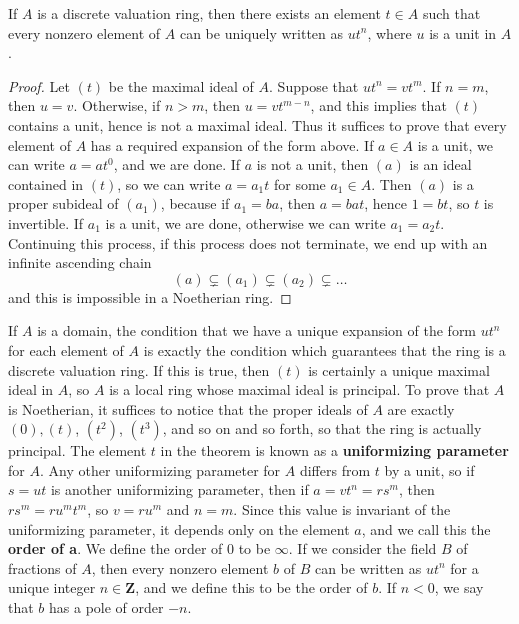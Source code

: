 \begin{prop}
    If $A$ is a discrete valuation ring, then there exists an element $t \in A$ such that every nonzero element of $A$ can be uniquely written as $ut^n$, where $u$ is a unit in $A$.
\end{prop}
\begin{proof}
    Let $(t)$ be the maximal ideal of $A$. Suppose that $ut^n = vt^m$. If $n = m$, then $u = v$. Otherwise, if $n > m$, then $u = vt^{m-n}$, and this implies that $(t)$ contains a unit, hence is not a maximal ideal. Thus it suffices to prove that every element of $A$ has a required expansion of the form above. If $a \in A$ is a unit, we can write $a = at^0$, and we are done. If $a$ is not a unit, then $(a)$ is an ideal contained in $(t)$, so we can write $a = a_1t$ for some $a_1 \in A$. Then $(a)$ is a proper subideal of $(a_1)$, because if $a_1 = ba$, then $a = bat$, hence $1 = bt$, so $t$ is invertible. If $a_1$ is a unit, we are done, otherwise we can write $a_1 = a_2t$. Continuing this process, if this process does not terminate, we end up with an infinite ascending chain
    \[ (a) \subsetneq (a_1) \subsetneq (a_2) \subsetneq \dots \]
    and this is impossible in a Noetherian ring.
\end{proof}

If $A$ is a domain, the condition that we have a unique expansion of the form $ut^n$ for each element of $A$ is exactly the condition which guarantees that the ring is a discrete valuation ring. If this is true, then $(t)$ is certainly a unique maximal ideal in $A$, so $A$ is a local ring whose maximal ideal is principal. To prove that $A$ is Noetherian, it suffices to notice that the proper ideals of $A$ are exactly $(0), (t)$, $(t^2)$, $(t^3)$, and so on and so forth, so that the ring is actually principal. The element $t$ in the theorem is known as a {\bf uniformizing parameter} for $A$. Any other uniformizing parameter for $A$ differs from $t$ by a unit, so if $s = ut$ is another uniformizing parameter, then if $a = vt^n = rs^m$, then $rs^m = ru^mt^m$, so $v = ru^m$ and $n = m$. Since this value is invariant of the uniformizing parameter, it depends only on the element $a$, and we call this the {\bf order of a}. We define the order of $0$ to be $\infty$. If we consider the field $B$ of fractions of $A$, then every nonzero element $b$ of $B$ can be written as $ut^n$ for a unique integer $n \in \mathbf{Z}$, and we define this to be the order of $b$. If $n < 0$, we say that $b$ has a pole of order $-n$.

